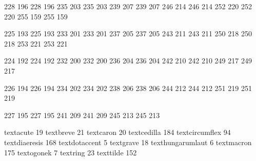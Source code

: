 

\startmapping[texnansi] 

 228 196  228 196  
 235 203  235 203
 239 207  239 207
 246 214  246 214
 252 220  252 220
 255 159  255 159

 225 193  225 193
 233 201  233 201
 237 205  237 205
 243 211  243 211
 250 218  250 218
 253 221  253 221

 224 192  224 192
 232 200  232 200
 236 204  236 204
 242 210  242 210
 249 217  249 217

 226 194  226 194
 234 202  234 202
 238 206  238 206
 244 212  244 212
 251 219  251 219

 227 195  227 195
 241 209  241 209
 245 213  245 213

\stopmapping

\startencoding[texnansi]

 textacute         19
 textbreve         21
 textcaron         20
 textcedilla      184  
 textcircumflex    94 %
 textdiaeresis    168
 textdotaccent      5
 textgrave         18
 texthungarumlaut   6
 textmacron       175 
 textogonek         7
 textring          23
 texttilde        152

